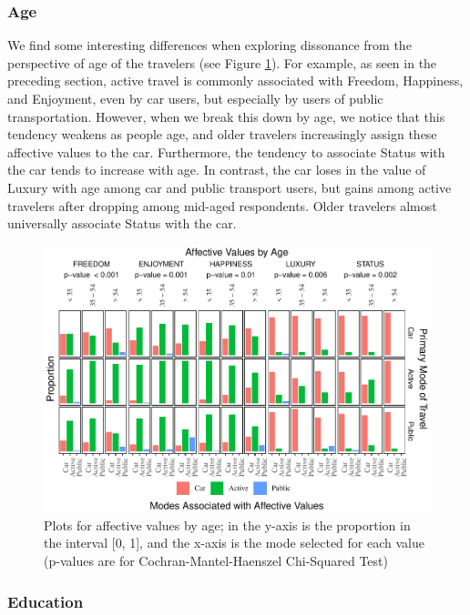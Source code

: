 \documentclass[]{elsarticle} %
\makeatletter
\def\maxwidth{\ifdim\Gin@nat@width>\linewidth\linewidth
\else\Gin@nat@width\fi}
\let\Oldincludegraphics\includegraphics
\renewcommand{\includegraphics}[1]{\Oldincludegraphics[width=\maxwidth]{#1}}
\makeatother
\begin{document}
\hypertarget{age-1}{%
\subsubsection{Age}\label{age-1}}

We find some interesting differences when exploring dissonance from the
perspective of age of the travelers (see Figure
\ref{fig:bar-plots-by-age}). For example, as seen in the preceding
section, active travel is commonly associated with Freedom, Happiness,
and Enjoyment, even by car users, but especially by users of public
transportation. However, when we break this down by age, we notice that
this tendency weakens as people age, and older travelers increasingly
assign these affective values to the car. Furthermore, the tendency to
associate Status with the car tends to increase with age. In contrast,
the car loses in the value of Luxury with age among car and public
transport users, but gains among active travelers after dropping among
mid-aged respondents. Older travelers almost universally associate
Status with the car.

\begin{figure}
\centering
\includegraphics{Dissonance_Santiago_v2_files/figure-latex/figure-bar-plots-by-attribute-and-age-1.pdf}
\caption{\label{fig:bar-plots-by-age}Plots for affective values by age;
in the y-axis is the proportion in the interval {[}0, 1{]}, and the
x-axis is the mode selected for each value (p-values are for
Cochran-Mantel-Haenszel Chi-Squared Test)}
\end{figure}

\hypertarget{education-1}{%
\subsubsection{Education}\label{education-1}}
\end{document}
